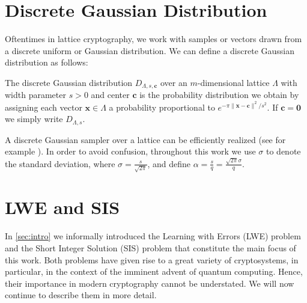 





\section{Discrete Gaussian Distribution}


Oftentimes in lattice cryptography, we work with samples or vectors drawn from a discrete uniform or Gaussian distribution. We can define a discrete Gaussian distribution as follows:
\begin{definition}
    The discrete Gaussian distribution $D_{\Lambda, s, \mathbf{c}}$ over an $m$-dimensional lattice $\Lambda$ with width parameter $s > 0$ and center $\mathbf{c}$ is the probability distribution we obtain by assigning each vector $\mathbf{x}\in \Lambda$ a probability proportional to $e^{-\pi \|\mathbf{x} - \mathbf{c}\|^2/s^2}$. If $\mathbf{c} = \mathbf{0}$ we simply write  $D_{\Lambda, s}$.
\end{definition}
A discrete Gaussian sampler over a lattice can be efficiently realized (see for example \cite{GPV08}). In order to avoid confusion, throughout this work we use $\sigma$ to denote the standard deviation, where $\sigma = \frac{s}{\sqrt{2 \pi}}$, and define $\alpha = \frac{s}{q} = \frac{\sqrt{2\pi} \sigma}{q}$.









\section{LWE and SIS}\label{sec:problems}
In \cref{sec:intro} we informally introduced the Learning with Errors (LWE) problem and the Short Integer Solution (SIS) problem that constitute the main focus of this work. Both problems have given rise to a great variety of cryptosystems, in particular, in the context of the imminent advent of quantum computing. Hence, their importance in modern cryptography cannot be understated. We will now continue to describe them in more detail.

